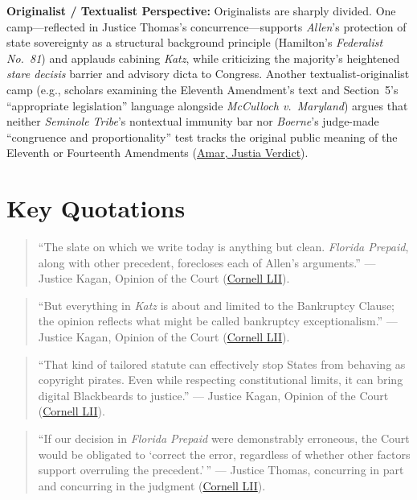\documentclass[12pt]{article}
\begin{document}
\textbf{Originalist / Textualist Perspective:} Originalists are sharply divided. One camp---reflected in Justice Thomas's concurrence---supports \textit{Allen}'s protection of state sovereignty as a structural background principle (Hamilton's \textit{Federalist No.\ 81}) and applauds cabining \textit{Katz}, while criticizing the majority's heightened \textit{stare decisis} barrier and advisory dicta to Congress. Another textualist-originalist camp (e.g., scholars examining the Eleventh Amendment's text and Section~5's ``appropriate legislation'' language alongside \textit{McCulloch v.\ Maryland}) argues that neither \textit{Seminole Tribe}'s nontextual immunity bar nor \textit{Boerne}'s judge-made ``congruence and proportionality'' test tracks the original public meaning of the Eleventh or Fourteenth Amendments (\href{https://verdict.justia.com/2020/04/10/how-allen-v-cooper-breaks-important-new-if-dubious-ground-on-stare-decisis}{Amar, Justia Verdict}).

\section{Key Quotations}
\begin{quote}
``The slate on which we write today is anything but clean. \textit{Florida Prepaid}, along with other precedent, forecloses each of Allen's arguments.'' --- Justice Kagan, Opinion of the Court (\href{https://www.law.cornell.edu/supremecourt/text/18-877}{Cornell LII}).
\end{quote}

\begin{quote}
``But everything in \textit{Katz} is about and limited to the Bankruptcy Clause; the opinion reflects what might be called bankruptcy exceptionalism.'' --- Justice Kagan, Opinion of the Court (\href{https://www.law.cornell.edu/supremecourt/text/18-877}{Cornell LII}).
\end{quote}

\begin{quote}
``That kind of tailored statute can effectively stop States from behaving as copyright pirates. Even while respecting constitutional limits, it can bring digital Blackbeards to justice.'' --- Justice Kagan, Opinion of the Court (\href{https://www.law.cornell.edu/supremecourt/text/18-877}{Cornell LII}).
\end{quote}

\begin{quote}
``If our decision in \textit{Florida Prepaid} were demonstrably erroneous, the Court would be obligated to `correct the error, regardless of whether other factors support overruling the precedent.'\,'' --- Justice Thomas, concurring in part and concurring in the judgment (\href{https://www.law.cornell.edu/supremecourt/text/18-877}{Cornell LII}).
\end{quote}
\end{document}
